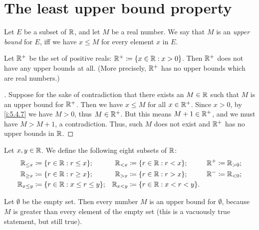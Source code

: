 \section{The least upper bound property}\label{i:sec:5.5}

\begin{defn}\label{i:5.5.1}
  Let \(E\) be a subset of \(\mathbb{R}\), and let \(M\) be a real number.
  We say that \(M\) is an \emph{upper bound} for \(E\), iff we have \(x \leq M\) for every element \(x\) in \(E\).
\end{defn}

\setcounter{thm}{2}
\begin{eg}\label{i:5.5.3}
  Let \(\mathbb{R}^+\) be the set of positive reals: \(\mathbb{R}^+ \coloneqq \left\lbrace x \in \mathbb{R} : x > 0\right\rbrace\).
  Then \(\mathbb{R}^+\) does not have any upper bounds at all.
  (More precisely, \(\mathbb{R}^+\) has no upper bounds which are real numbers.)
\end{eg}

\begin{proof}[]
  Suppose for the sake of contradiction that there exists an \(M \in \mathbb{R}\) such that \(M\) is an upper bound for \(\mathbb{R}^+\).
  Then we have \(x \leq M\) for all \(x \in \mathbb{R}^+\).
  Since \(x > 0\), by \cref{i:5.4.7} we have \(M > 0\), thus \(M \in \mathbb{R}^+\).
  But this means \(M + 1 \in \mathbb{R}^+\), and we must have \(M > M + 1\), a contradiction.
  Thus, such \(M\) does not exist and \(\mathbb{R}^+\) has no upper bounds in \(\mathbb{R}\).
\end{proof}

\begin{ac}\label{i:ac:5.5.1}
  Let \(x, y \in \mathbb{R}\).
  We define the following eight subsets of \(\mathbb{R}\):
  \begin{align*}
    \R_{\leq x}   & \coloneqq \set{r \in \R : r \leq x};        & \R_{< x}   & \coloneqq \set{r \in \R : r < x};     & \R^+ & \coloneqq \R_{> 0}; \\
    \R_{\geq x}   & \coloneqq \set{r \in \R : r \geq x};        & \R_{> x}   & \coloneqq \set{r \in \R : r > x};     & \R^- & \coloneqq \R_{< 0}; \\
    \R_{x \leq y} & \coloneqq \set{r \in \R : x \leq r \leq y}; & \R_{x < y} & \coloneqq \set{r \in \R : x < r < y}. &      &
  \end{align*}
\end{ac}

\begin{eg}\label{i:5.5.4}
  Let \(\emptyset\) be the empty set.
  Then every number \(M\) is an upper bound for \(\emptyset\), because \(M\) is greater than every element of the empty set
  (this is a vacuously true statement, but still true).
\end{eg}

